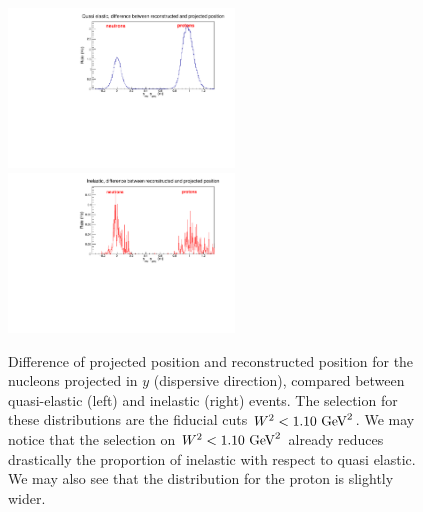 \documentclass[11pt]{article}
\begin{document}
%

%
\begin{figure}[!h]
  \centering
    \includegraphics[width=6cm]{HCal_PID_QE_y.pdf}
    \includegraphics[width=6cm]{HCal_PID_Inel_y.pdf}
    \caption{Difference of projected position and reconstructed position for the nucleons projected in $y$ (dispersive direction), compared between quasi-elastic (left) and inelastic (right) events. The selection for these distributions are the fiducial cuts $W^2<1.10~{\rm GeV}^2$. We may notice that the selection on $W^2<1.10~{\rm GeV}^2$ already reduces drastically the proportion of inelastic with respect to quasi elastic. We may also see that the distribution for the proton is slightly wider. %
    }
    \label{hcal_id_y}
\end{figure}
%
\end{document}
